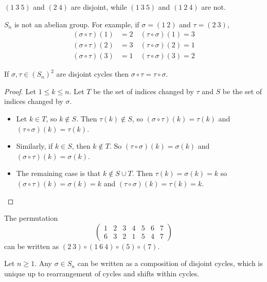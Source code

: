 \begin{example}
	$(1 \ 3 \ 5)$ and $(2 \ 4)$ are disjoint, while $(1 \ 3 \ 5)$ and $(1 \ 2 \ 4)$ are not.
\end{example}

\begin{remark}
	$S_n$ is not an abelian group. For example, if $\sigma = (1 \ 2)$ and $\tau = (2 \ 3)$,
	\[
		\begin{aligned}
			(\sigma \circ \tau)(1) & = 2 \quad (\tau \circ \sigma)(1) = 3 \\
			(\sigma \circ \tau)(2) & = 3 \quad (\tau \circ \sigma)(2) = 1 \\
			(\sigma \circ \tau)(3) & = 1 \quad (\tau \circ \sigma)(3) = 2
		\end{aligned}
	\]
\end{remark}

\begin{lemma}
	If $\sigma, \tau \in {(S_n)}^2$ are disjoint cycles then $\sigma \circ \tau = \tau \circ \sigma$.
\end{lemma}

\begin{proof}
	Let $1 \le k \le n$. Let $T$ be the set of indices changed by $\tau$ and $S$ be the set of indices changed by $\sigma$.
	\begin{itemize}
		\item Let $k \in T$, so $k \notin S$. Then $\tau(k) \notin S$, so $(\sigma \circ \tau)(k) = \tau(k)$ and $(\tau \circ \sigma)(k) = \tau(k)$.
		\item Similarly, if $k \in S$, then $k \notin T$. So $(\tau \circ \sigma)(k) = \sigma(k)$ and $(\sigma \circ \tau)(k) = \sigma(k)$.
		\item The remaining case is that $k \notin S \cup T$. Then $\tau(k) = \sigma(k) = k$ so $(\sigma \circ \tau)(k) = \sigma(k) = k$ and $(\tau \circ \sigma)(k) = \tau(k) = k$.
	\end{itemize}
\end{proof}

\begin{example}
	The permutation
	\[
		\begin{pmatrix}
			1 & 2 & 3 & 4 & 5 & 6 & 7 \\
			6 & 3 & 2 & 1 & 5 & 4 & 7
		\end{pmatrix}
	\]
	can be written as $(2 \ 3) \circ (1 \ 6 \ 4) \circ (5) \circ (7)$.
\end{example}

\begin{proposition}\label{ref:permutationIsProductOfDisjointCycles}
	Let $n \ge 1$. Any $\sigma \in S_n$ can be written as a composition of disjoint cycles, which is unique up to rearrangement of cycles and shifts within cycles.
\end{proposition}

